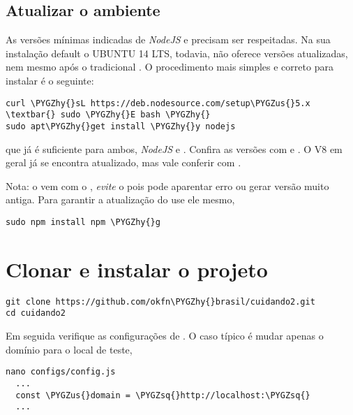 \documentclass[letterpaper,10pt,english]{sphinxmanual}
\def\PYGZus{\char`\_}
\def\PYGZhy{\char`\-}
\def\PYGZsq{\char`\'}
\renewcommand\PYGZsq{\textquotesingle}
\begin{document}
\section{Atualizar o ambiente}
\label{install-site:atualizar-o-ambiente}
As versões mínimas indicadas de \emph{NodeJS} e  precisam ser
respeitadas. Na sua instalação default o UBUNTU 14 LTS, todavia, não
oferece versões atualizadas, nem mesmo após o tradicional
. O procedimento mais simples e correto para instalar
é o seguinte:

\begin{Verbatim}[commandchars=\\\{\}]
curl \PYGZhy{}sL https://deb.nodesource.com/setup\PYGZus{}5.x \textbar{} sudo \PYGZhy{}E bash \PYGZhy{}
sudo apt\PYGZhy{}get install \PYGZhy{}y nodejs
\end{Verbatim}

que já é suficiente para ambos, \emph{NodeJS} e . Confira as versões
com  e . O V8 em geral já se encontra
atualizado, mas vale conferir com .

Nota: o  vem com o , \emph{evite} o 
pois pode aparentar erro ou gerar versão muito antiga. Para garantir a
atualização do  use ele mesmo,

\begin{Verbatim}[commandchars=\\\{\}]
sudo npm install npm \PYGZhy{}g
\end{Verbatim}


\chapter{Clonar e instalar o projeto}
\label{install-site:clonar-e-instalar-o-projeto}
\begin{Verbatim}[commandchars=\\\{\}]
git clone https://github.com/okfn\PYGZhy{}brasil/cuidando2.git
cd cuidando2
\end{Verbatim}

Em seguida verifique as configurações de . O caso
típico é mudar apenas o domínio para o local de teste,

\begin{Verbatim}[commandchars=\\\{\}]
nano configs/config.js
  ...
  const \PYGZus{}domain = \PYGZsq{}http://localhost:\PYGZsq{}
  ...
\end{Verbatim}
\end{document}
